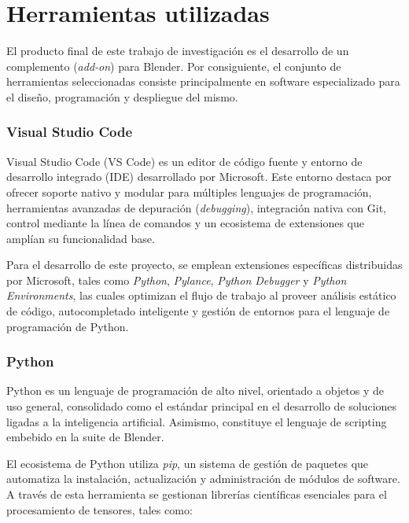 \section{Herramientas utilizadas}
El producto final de este trabajo de investigación es el desarrollo de un complemento 
(\textit{add-on}) para Blender. Por consiguiente, el conjunto de herramientas seleccionadas 
consiste principalmente en software especializado para el diseño, programación y despliegue 
del mismo.

\subsubsection{Visual Studio Code}
Visual Studio Code (VS Code) es un editor de código fuente y entorno de desarrollo 
integrado (IDE) desarrollado por Microsoft. Este entorno destaca por ofrecer soporte 
nativo y modular para múltiples lenguajes de programación, herramientas avanzadas de 
depuración (\textit{debugging}), integración nativa con Git, control mediante la línea 
de comandos y un ecosistema de extensiones que amplían su funcionalidad base.
\medskip

Para el desarrollo de este proyecto, se emplean extensiones específicas distribuidas por 
Microsoft, tales como \textit{Python}, \textit{Pylance}, \textit{Python Debugger} y 
\textit{Python Environments}, las cuales optimizan el flujo de trabajo al proveer 
análisis estático de código, autocompletado inteligente y gestión de entornos para
el lenguaje de programación de Python.

\subsubsection{Python}
Python es un lenguaje de programación de alto nivel, orientado a objetos y de uso general, 
consolidado como el estándar principal en el desarrollo de soluciones ligadas a la 
inteligencia artificial. Asimismo, constituye el lenguaje de scripting embebido en la 
suite de Blender.
\medskip

El ecosistema de Python utiliza \textit{pip}, un sistema de gestión de paquetes que automatiza la instalación, 
actualización y administración de módulos de software. A través de esta herramienta se gestionan librerías 
científicas esenciales para el procesamiento de tensores, tales como:

